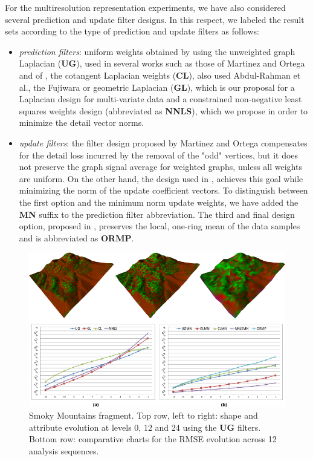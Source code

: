 \documentclass[graybox]{svmult}
\begin{document}
	
	For the multiresolution representation experiments, we have also considered several prediction and update filter designs. In this respect, we labeled the result sets according to the type of prediction and update filters as follows:
	\begin{itemize}
		\item{\emph{prediction filters}}: uniform weights obtained by using the unweighted graph Laplacian (\textbf{UG}), used in several works such as those of Martinez and Ortega \cite{Martinez2011} and of \cite{AbdulRahman2013}, the cotangent Laplacian weights (\textbf{CL}), also used Abdul-Rahman et al., the Fujiwara or geometric Laplacian (\textbf{GL}), which is our proposal for a Laplacian design for multi-variate data and a constrained  non-negative least squares weights design (abbreviated as \textbf{NNLS}), which we propose in order to minimize the detail vector norms.
		\item{\emph{update filters}}: the filter design proposed by Martinez and Ortega \cite{Martinez2011} compensates for the detail loss incurred by the removal of the "odd" vertices, but it does not preserve the graph signal average for weighted graphs, unless all weights are uniform. On the other hand, the design used in \cite{Jansen2001,Wagner2005}, achieves this goal while minimizing the norm of the update coefficient vectors. To distinguish between the first option and the minimum norm update weights, we have added the \textbf{MN} suffix to the prediction filter abbreviation. The third and final design option, proposed in \cite{AbdulRahman2013}, preserves the local, one-ring mean of the data samples  and is abbreviated as \textbf{ORMP}.
	\end{itemize}
	
	\begin{figure}[!htbp]
		\centering
		\includegraphics{smokey_lod_rmse.pdf}
		
		\caption{\label{fig_cds:smokey_lod_rmse}%
			Smoky Mountains fragment. Top row, left to right: shape and attribute evolution at levels 0, 12 and 24 using the \textbf{UG} filters. Bottom row: comparative charts for the RMSE evolution across 12 analysis sequences. }
	\end{figure}
	
\end{document}
